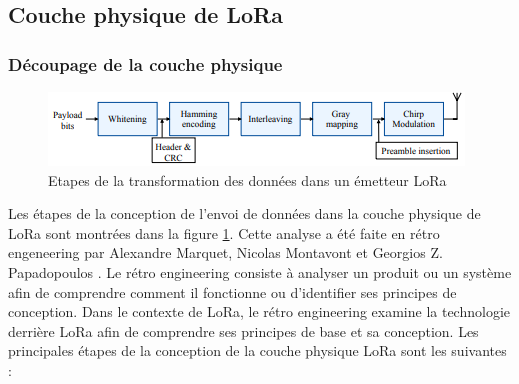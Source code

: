 \subsection{Couche physique de LoRa}

\subsubsection{Découpage de la couche physique}

\begin{figure}[h]
\centering

\includegraphics[scale=1]{images/physical_lora_rx.PNG}
\caption{Etapes de la transformation des données dans un émetteur LoRa \cite{loraphy}}\label{term4}
\end{figure}


Les étapes de la conception de l'envoi de données dans la couche physique de \ac{LoRa} sont montrées dans la figure \ref{term4}. Cette analyse a été faite en rétro engeneering par Alexandre Marquet, Nicolas Montavont et Georgios Z. Papadopoulos \cite{lorareverse}. Le rétro engineering consiste à analyser un produit ou un système afin de comprendre comment il fonctionne ou d'identifier ses principes de conception. Dans le contexte de LoRa, le rétro engineering examine la technologie derrière LoRa afin de comprendre ses principes de base et sa conception. Les principales étapes de la conception de la couche physique \ac{LoRa} sont les suivantes :

\vspace{0.1cm}

